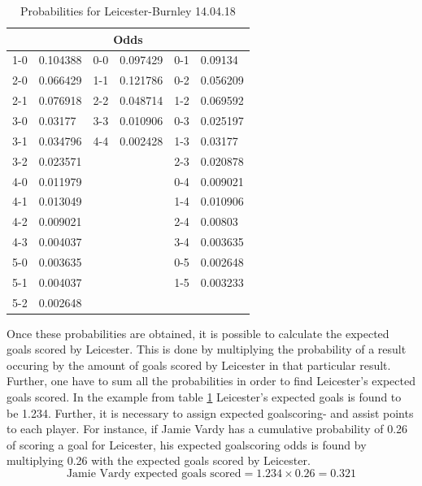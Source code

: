 \begin{table}[H]
\centering
\caption{Probabilities for Leicester-Burnley 14.04.18}
\label{Prob.Lei-Bur}
\begin{tabular}{|ll|ll|ll|}
\multicolumn{6}{c}{Odds}                         \\
\hline
1-0 & 0.104388 & 0-0 & 0.097429 & 0-1 & 0.09134  \\
2-0 & 0.066429 & 1-1 & 0.121786 & 0-2 & 0.056209 \\
2-1 & 0.076918 & 2-2 & 0.048714 & 1-2 & 0.069592 \\
3-0 & 0.03177  & 3-3 & 0.010906 & 0-3 & 0.025197 \\
3-1 & 0.034796 & 4-4 & 0.002428 & 1-3 & 0.03177  \\
3-2 & 0.023571 &     &          & 2-3 & 0.020878 \\
4-0 & 0.011979 &     &          & 0-4 & 0.009021 \\
4-1 & 0.013049 &     &          & 1-4 & 0.010906 \\
4-2 & 0.009021 &     &          & 2-4 & 0.00803  \\
4-3 & 0.004037 &     &          & 3-4 & 0.003635 \\
5-0 & 0.003635 &     &          & 0-5 & 0.002648 \\
5-1 & 0.004037 &     &          & 1-5 & 0.003233 \\
5-2 & 0.002648 &     &          &     &         \\
\hline
\end{tabular}
\end{table}

Once these probabilities are obtained, it is possible to calculate the expected goals scored by Leicester. This is done by multiplying the probability of a result occuring by the amount of goals scored by Leicester in that particular result. Further, one have to sum all the probabilities in order to find Leicester's expected goals scored. In the example from table \ref{Prob.Lei-Bur} Leicester's expected goals is found to be 1.234. 
\newpar
Further, it is necessary to assign expected goalscoring- and assist points to each player. For instance, if Jamie Vardy has a cumulative probability of 0.26 of scoring a goal for Leicester, his expected goalscoring odds is found by multiplying 0.26 with the expected goals scored by Leicester. 
\begin{equation*}
    \textrm{Jamie Vardy expected goals scored} = 1.234 \times 0.26 = 0.321
\end{equation*}

